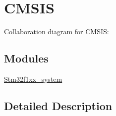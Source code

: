 \hypertarget{group__CMSIS}{}\section{C\+M\+S\+IS}
\label{group__CMSIS}
Collaboration diagram for C\+M\+S\+IS\+:
\subsection*{Modules}
\begin{DoxyCompactItemize}
\item 
\hyperlink{group__stm32f1xx__system}{Stm32f1xx\+\_\+system}
\end{DoxyCompactItemize}


\subsection{Detailed Description}
